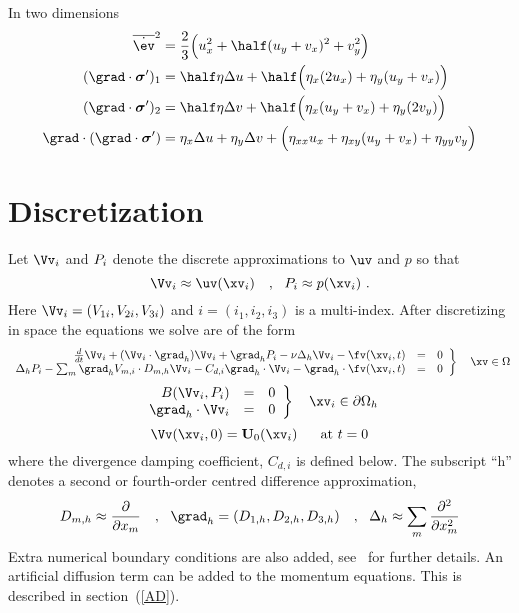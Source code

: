 \documentclass[12pt]{article}
\begin{document}
In two dimensions
\begin{align*}
 \esr^2 &=  {2\over 3} \Big( u_x^2 + \half ( u_y + v_x )^2 + v_y^2 \Big)  \\
 (\grad\cdot \sigmav')_1 &= \half\eta\Delta u 
         +\half\Big( \eta_x(2u_x) + \eta_y(u_y+v_x)\Big) \\
 (\grad\cdot \sigmav')_2 &= \half\eta\Delta v 
         +\half\Big( \eta_x(u_y+v_x) + \eta_y(2v_y)\Big) \\
 \grad\cdot(\grad\cdot \sigmav') &= \eta_x\Delta u + \eta_y\Delta v +
    \Big( \eta_{xx}u_x+ \eta_{xy}(u_y+v_x) + \eta_{yy}v_y \Big)
\end{align*}


\section{ Discretization}

\newcommand{\id}{i}
\def\Fs {{\cal F}}
Let $\Vv_i$ and $\pd_\id$ denote the discrete approximations to
$\uv$ and $p$ so that
\[
      \Vv_i \approx \uv(\xv_{\id})  \comma
      \pd_{\id} \approx p(\xv_{\id})  ~.
\]
Here $\Vv_i=(V_{1\id},V_{2\id},V_{3\id})$ and
$\id=(i_1,i_2,i_3)$ is a multi-index.
After discretizing in space the equations we solve are of the form
$$
 \left. \begin{array}{rcl}
  {d\over dt} \Vv_i + (\Vv_i\cdot\grad_h)\Vv_i + \grad_h \pd_i
       - \nu \Delta_h \Vv_i -\fv(\xv_i,t) &=&0
                                                \\
  \Delta_h \pd_i - \sum_m \grad_h V_{m,i} \cdot D_{m,h} \Vv_i
   - C_{d,i} \grad_h\cdot\Vv_i
   - \grad_h\cdot\fv(\xv_i,t)  &=&0
        \end{array}\right\} ~~~ \xv\in\Omega
$$
$$
 \left. \begin{array}{rcl}
        B(\Vv_i,\pd_i) &=& 0   \\
   \grad_h\cdot\Vv_i &=& 0
        \end{array}\right\} ~~~ \xv_i\in\partial\Omega_h
$$
$$
   \Vv(\xv_i,0) = \uvd_0(\xv_i)   ~~~~\mbox{ at } t=0
$$
where the divergence damping coefficient, $C_{d,i}$ is defined below.
The subscript ``h'' denotes a second or fourth-order centred difference
approximation,
$$
  D_{m,h} \approx {\partial \over \partial x_m} ~~~,~~
  \grad_h = (D_{1,h}, D_{2,h}, D_{3,h} ) ~~~,~~
  \Delta_h \approx \sum_m {\partial^2 \over \partial x_m^2}
$$
Extra numerical boundary conditions are also added, see~\cite{ICNS}
\cite{BCNS} for further details. An artificial diffusion term can be
added to the momentum equations. This is described in section~(\ref{AD}).
\end{document}
